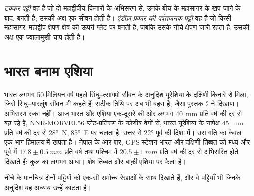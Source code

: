 \begin{definition}[टक्कर-पट्टी; एंडीज़-प्रकार की पर्वतजनक पट्टी]\label{def:b2:himalaya-andes:types}
\emph{टक्कर-पट्टी} वह  है जो दो महाद्वीपीय किनारों के
अभिसरण से, उनके बीच के महासागर के खप जाने के बाद, बनती है; उसकी अक्ष एक सीवन होती है।
\emph{एंडीज़-प्रकार की पर्वतजनक पट्टी} वह  है जो किसी महासागर--महाद्वीप क्षेपण-क्षेत्र की
ऊपरी प्लेट पर बनती है, जबकि उसके नीचे क्षेपण जारी रहता है; उसकी अक्ष
एक ज्वालामुखी चाप होती है।
\end{definition}


\section{भारत बनाम एशिया}\label{sec:b2:himalaya-andes:himalaya}

भारत लगभग 50 मिलियन वर्ष पहले सिंधु--त्सांगपो सीवन के अनुदिश यूरेशिया के दक्षिणी किनारे से मिला,
जिसे सिंधु--यारलुंग सीवन भी कहते हैं; सटीक तिथि पर अब भी बहस है, जैसा
पुस्तक 2 ने दिखाया। अभिसरण रुका नहीं। आज भारत और एशिया एक-दूसरे की ओर
लगभग \qty{40}{mm} प्रति वर्ष की दर से बढ़ रहे हैं; NNR-MORVEL56 प्लेट-प्रतिरूप के कोणीय वेगों से,
भारत यूरेशिया के सापेक्ष \qty{45}{mm} प्रति वर्ष की दर से \ang{28}~N, \ang{85}~E पर चलता है, उत्तर से
\ang{22} पूर्व की दिशा में। उस गति का केवल एक भाग हिमालय में खपता है। नेपाल के आर-पार,
GPS स्टेशन भारत और दक्षिणी तिब्बत को मध्य और पूर्व में $17.8 \pm \qty{0.5}{mm}$ प्रति वर्ष तथा
पश्चिम में $20.5 \pm \qty{1}{mm}$ प्रति वर्ष की दर से अभिसरित होते दिखाते हैं: कुल का लगभग आधा। शेष
तिब्बत और बाक़ी एशिया पर फैला है।

नीचे के मानचित्र दोनों पट्टियों को एक-सी समोच्च रेखाओं के साथ दिखाते हैं, और वे पट्टियाँ भी जिनके अनुदिश यह
अध्याय उन्हें काटता है।

